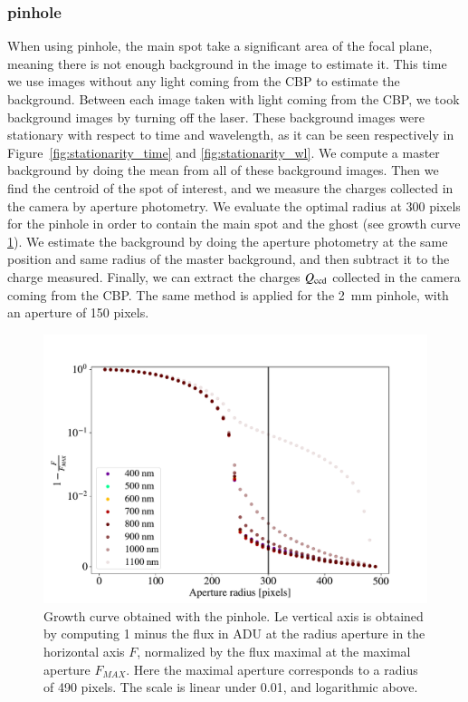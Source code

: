 \subsubsection{\bpinhole pinhole}

When using \bpinhole pinhole, the main spot take a significant area of the focal plane, meaning there is not enough background in the image to estimate it. This time we use images without any light coming from the CBP to estimate the background. Between each image taken with light coming from the CBP, we took background images by turning off the laser. These background images were stationary with respect to time and wavelength, as it can be seen respectively in Figure~\ref{fig:stationarity_time} and \ref{fig:stationarity_wl}. We compute a master background by doing the mean from all of these background images. Then we find the centroid of the spot of interest, and we measure the charges collected in the \SD camera by aperture photometry. We evaluate the optimal radius at 300 pixels for the \bpinhole pinhole in order to contain the main spot and the ghost (see growth curve \ref{fig:growth_5mm}). We estimate the background by doing the aperture photometry at the same position and same radius of the master background, and then subtract it to the charge measured. Finally, we can extract the charges $Q_{\mathrm{ccd}}$ collected in the \SD camera coming from the CBP. The same method is applied for the \SI{2}{\milli\meter} pinhole, with an aperture of 150 pixels.

\begin{figure}[h]
    \centering
    \includegraphics[width=\columnwidth]{fig/growth_curve_5mm.pdf}
    \caption{Growth curve obtained with the \spinhole pinhole. Le vertical axis is obtained by computing 1 minus the flux in ADU at the radius aperture in the horizontal axis $F$, normalized by the flux maximal at the maximal aperture $F_{MAX}$. Here the maximal aperture corresponds to a radius of 490 pixels. The scale is linear under 0.01, and logarithmic above.}
    \label{fig:growth_5mm}    
\end{figure}

